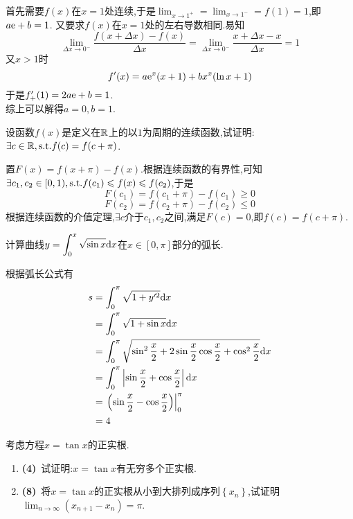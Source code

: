 \documentclass{ctexart}
\begin{document}
\begin{solution}[Solution.]
    首先需要$f(x)$在$x=1$处连续,于是$\displaystyle\lim_{x\to1^+}=\lim_{x\to1^-}=f(1)=1$,即$a\mathrm{e}+b=1$.
    又要求$f(x)$在$x=1$处的左右导数相同.易知
    $$\lim_{\Delta x\to0^-}\dfrac{f(x+\Delta x)-f(x)}{\Delta x}=\lim_{\Delta x\to0^-}\dfrac{x+\Delta x-x}{\Delta x}=1$$
    又$x>1$时$$f'(x)=a\mathrm{e}^x(x+1)+bx^x(\ln x+1)$$
    于是$f'_+(1)=2a\mathrm{e}+b=1$.\\
    综上可以解得$a=0,b=1$.
\end{solution}
\begin{problem}[5.(12\songti{分})]
    设函数$f(x)$是定义在$\mathbb{R}$上的以$1$为周期的连续函数,试证明:$\exists c\in\mathbb{R},\text{s.t.} f(c)=f(c+\pi)$.
\end{problem}
\begin{solution}[Proof.]
    置$F(x)=f(x+\pi)-f(x)$.根据连续函数的有界性,可知$\exists c_1,c_2\in[0,1),\text{s.t.} f(c_1)\leqslant f(x)\leqslant f(c_2)$,于是
    $$F(c_1)=f(c_1+\pi)-f(c_1)\geqslant0$$
    $$F(c_2)=f(c_2+\pi)-f(c_2)\leqslant0$$
    根据连续函数的介值定理,$\exists c$介于$c_1,c_2$之间,满足$F(c)=0$,即$f(c)=f(c+\pi)$.
\end{solution}
\begin{problem}[6.(8\songti{分})]
    计算曲线$\displaystyle y=\int_0^x\sqrt{\sin x}\mathrm{d} x$在$x\in[0,\pi]$部分的弧长.
\end{problem}
\begin{solution}[Solution]
    根据弧长公式有
    $$\begin{aligned}
        s
        &= \int_0^\pi\sqrt{1+y'^2}\mathrm{d} x \\
        &= \int_0^\pi\sqrt{1+\sin x}\mathrm{d} x \\
        &= \int_0^\pi\sqrt{\sin^2\dfrac{x}{2}+2\sin\dfrac{x}{2}\cos\dfrac{x}{2}+\cos^2\dfrac{x}{2}}\mathrm{d} x \\
        &= \int_0^\pi\left|\sin\dfrac{x}{2}+\cos\dfrac{x}{2}\right|\mathrm{d} x \\
        &= \left.\left(\sin\dfrac{x}{2}-\cos\dfrac{x}{2}\right)\right|_0^\pi \\
        &= 4
    \end{aligned}$$
\end{solution}
\begin{problem}[7.(12\songti{分})]
    考虑方程$x=\tan x$的正实根.
    \begin{enumerate}[label=\textbf{(\arabic*)}]
        \item \textbf{(4)}\ 试证明:$x=\tan x$有无穷多个正实根.
        \item \textbf{(8)}\ 将$x=\tan x$的正实根从小到大排列成序列$\left\{x_n\right\}$,试证明$\displaystyle\lim_{n\to\infty}\left(x_{n+1}-x_n\right)=\pi$.
    \end{enumerate}
\end{problem}
\end{document}
